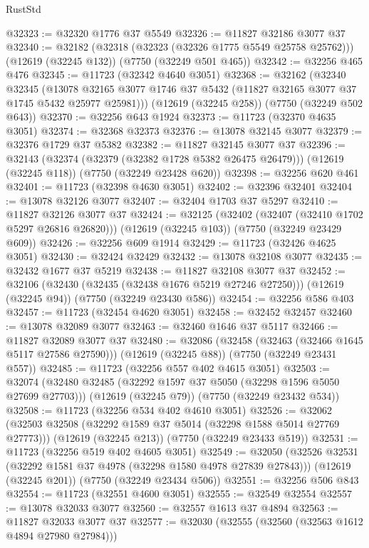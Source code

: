 \begin{lexlean}{RustStd}
\begin{coremodule}
@32323 := @32320 @1776 @37 @5549
@32326 := @11827 @32186 @3077 @37
@32340 := @32182
    (@32318 (@32323 (@32326 @1775 @5549 @25758 @25762)))
    (@12619 (@32245 @132))
    (@7750 (@32249 @501 @465))
@32342 := @32256 @465 @476
@32345 := @11723 (@32342 @4640 @3051)
@32368 := @32162
    (@32340
      @32345
      (@13078 @32165 @3077 @1746 @37 @5432 (@11827 @32165 @3077 @37 @1745 @5432 @25977 @25981)))
    (@12619 (@32245 @258))
    (@7750 (@32249 @502 @643))
@32370 := @32256 @643 @1924
@32373 := @11723 (@32370 @4635 @3051)
@32374 := @32368 @32373
@32376 := @13078 @32145 @3077
@32379 := @32376 @1729 @37 @5382
@32382 := @11827 @32145 @3077 @37
@32396 := @32143
    (@32374 (@32379 (@32382 @1728 @5382 @26475 @26479)))
    (@12619 (@32245 @118))
    (@7750 (@32249 @23428 @620))
@32398 := @32256 @620 @461
@32401 := @11723 (@32398 @4630 @3051)
@32402 := @32396 @32401
@32404 := @13078 @32126 @3077
@32407 := @32404 @1703 @37 @5297
@32410 := @11827 @32126 @3077 @37
@32424 := @32125
    (@32402 (@32407 (@32410 @1702 @5297 @26816 @26820)))
    (@12619 (@32245 @103))
    (@7750 (@32249 @23429 @609))
@32426 := @32256 @609 @1914
@32429 := @11723 (@32426 @4625 @3051)
@32430 := @32424 @32429
@32432 := @13078 @32108 @3077
@32435 := @32432 @1677 @37 @5219
@32438 := @11827 @32108 @3077 @37
@32452 := @32106
    (@32430 (@32435 (@32438 @1676 @5219 @27246 @27250)))
    (@12619 (@32245 @94))
    (@7750 (@32249 @23430 @586))
@32454 := @32256 @586 @403
@32457 := @11723 (@32454 @4620 @3051)
@32458 := @32452 @32457
@32460 := @13078 @32089 @3077
@32463 := @32460 @1646 @37 @5117
@32466 := @11827 @32089 @3077 @37
@32480 := @32086
    (@32458 (@32463 (@32466 @1645 @5117 @27586 @27590)))
    (@12619 (@32245 @88))
    (@7750 (@32249 @23431 @557))
@32485 := @11723 (@32256 @557 @402 @4615 @3051)
@32503 := @32074
    (@32480 @32485 (@32292 @1597 @37 @5050 (@32298 @1596 @5050 @27699 @27703)))
    (@12619 (@32245 @79))
    (@7750 (@32249 @23432 @534))
@32508 := @11723 (@32256 @534 @402 @4610 @3051)
@32526 := @32062
    (@32503 @32508 (@32292 @1589 @37 @5014 (@32298 @1588 @5014 @27769 @27773)))
    (@12619 (@32245 @213))
    (@7750 (@32249 @23433 @519))
@32531 := @11723 (@32256 @519 @402 @4605 @3051)
@32549 := @32050
    (@32526 @32531 (@32292 @1581 @37 @4978 (@32298 @1580 @4978 @27839 @27843)))
    (@12619 (@32245 @201))
    (@7750 (@32249 @23434 @506))
@32551 := @32256 @506 @843
@32554 := @11723 (@32551 @4600 @3051)
@32555 := @32549 @32554
@32557 := @13078 @32033 @3077
@32560 := @32557 @1613 @37 @4894
@32563 := @11827 @32033 @3077 @37
@32577 := @32030
    (@32555 (@32560 (@32563 @1612 @4894 @27980 @27984)))

\end{coremodule}
\end{lexlean}
